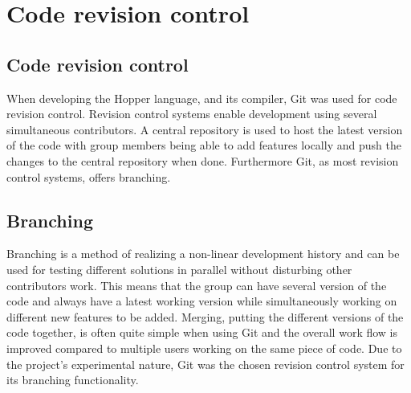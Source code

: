 \section{Code revision control}


\subsection{Code revision control}

When developing the Hopper language, and its compiler, Git was used for code revision control.
Revision control systems enable development using several simultaneous contributors.
A central repository is used to host the latest version of the code with group members
being able to add features locally and push the changes to the central repository when done.  
Furthermore Git, as most revision control systems, offers branching. 

\subsection{Branching}

Branching is a method of realizing a non-linear development history and can be used for 
testing different solutions in parallel without disturbing other contributors work.
This means that the group can have several version of the code and always have a
latest working version while simultaneously working on different new features
to be added. Merging, putting the different versions of the code together, is often
quite simple when using Git and the overall work flow is improved compared to
multiple users working on the same piece of code. 
Due to the project's experimental nature, Git was the chosen revision control system 
for its branching functionality.


